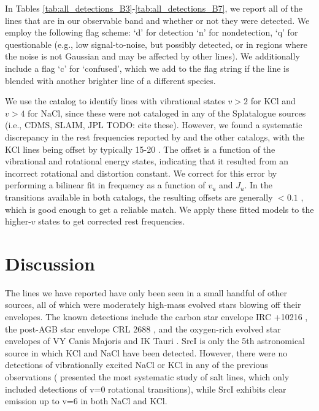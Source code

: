 \documentclass[twocolumn]{aastex62}
\newcommand{\sourcei}{SrcI\xspace}
\begin{document}
In Tables \ref{tab:all_detections_B3}-\ref{tab:all_detections_B7}, we report
all of the lines that are in our observable band and whether or not they were
detected.  We employ the following
flag scheme:
`d' for detection `n' for nondetection, `q' for questionable (e.g., low
signal-to-noise, but possibly detected, or in regions where the noise is
not Gaussian and may be affected by other lines).
We additionally include a flag `c' for `confused', which we add to the flag
string if the line is blended with another brighter line of a different species.

We use the \citet{Barton2014a} catalog to identify lines with vibrational
states $v>2$ for KCl and $v>4$ for NaCl, since these were not cataloged in any
of the Splatalogue sources (i.e., CDMS, SLAIM, JPL {\color{red}TODO: cite
these}).   However, we found a systematic discrepancy in the rest frequencies
reported by \citet{Barton2014a} and the other catalogs, with the KCl lines
being offset by typically 15-20 \kms.  The offset is a function of the vibrational
and rotational energy states, indicating that it resulted from an incorrect rotational
and distortion constant.  We correct for this error by performing a bilinear fit
in frequency as a function of $v_u$ and $J_u$.  In the transitions available
in both catalogs, the resulting offsets are generally $<0.1$ \kms, which is
good enough to get a reliable match.  We apply these fitted models to the
higher-$v$ states to get corrected rest frequencies.










\section{Discussion}
The lines we have reported have only been seen in a small handful of other sources,
all of which were moderately high-mass evolved stars blowing off their envelopes.
The known detections include the carbon star envelope IRC +10216 \citep{Cernicharo1987a},
the post-AGB star envelope CRL 2688 \citep{Highberger2003a}, and the oxygen-rich
evolved star envelopes of VY Canis Majoris and IK Tauri \citep{Milam2007a}.
\sourcei is only the 5th astronomical source in which KCl and NaCl have been
detected.
However, there were no detections of vibrationally excited NaCl or KCl in any
of the previous observations (\citealt{Agundez2012a} presented the most
systematic study of salt lines, which only included detections of v=0
rotational transitions),
while \sourcei exhibits clear emission up to v=6 in both NaCl and KCl.
\end{document}
